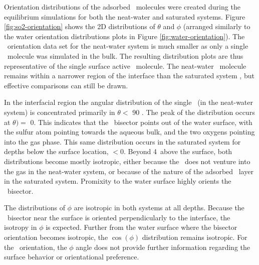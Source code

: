 Orientation distributions of the adsorbed \suldiox~molecules were created during the equilibrium simulations for both the neat-water and saturated systems. Figure \ref{fig:so2-orientation} shows the 2D distributions of $\theta$ and $\phi$ (arranged similarly to the water orientation distributions plots in Figure \ref{fig:water-orientation}). The \suldiox~orientation data set for the neat-water system is much smaller as only a single \suldiox~molecule was simulated in the bulk. The resulting distribution plots are thus representative of the single surface active \suldiox~molecule. The neat-water \suldiox~molecule remains within a narrower region of the interface than the saturated system \suldiox, but effective comparisons can still be drawn.

In the interfacial region the angular distribution of the single \suldiox~(in the neat-water system) is concentrated primarily in $\theta <$ 90 \textdegree. The peak of the distribution occurs at $\theta)=$ 0\textdegree. This indicates that the \suldiox~bisector points out of the water surface, with the sulfur atom pointing towards the aqueous bulk, and the two oxygens pointing into the gas phase. This same distribution occurs in the saturated system for depths below the surface location, $< 0$\angs. Beyond 4\angs~above the surface, both distributions become mostly isotropic, either because the \suldiox~does not venture into the gas in the neat-water system, or because of the nature of the adsorbed \suldiox~layer in the saturated system. Promixity to the water surface highly orients the \suldiox~bisector. %

The distributions of $\phi$ are isotropic in both systems at all depths. Because the \suldiox~bisector near the surface is oriented perpendicularly to the interface, the isotropy in $\phi$ is expected. Further from the water surface where the bisector orientation becomes isotropic, the $\cos(\phi)$ distribution remains isotropic. For the \suldiox~orientation, the $\phi$ angle does not provide further information regarding the surface behavior or orientational preference.

